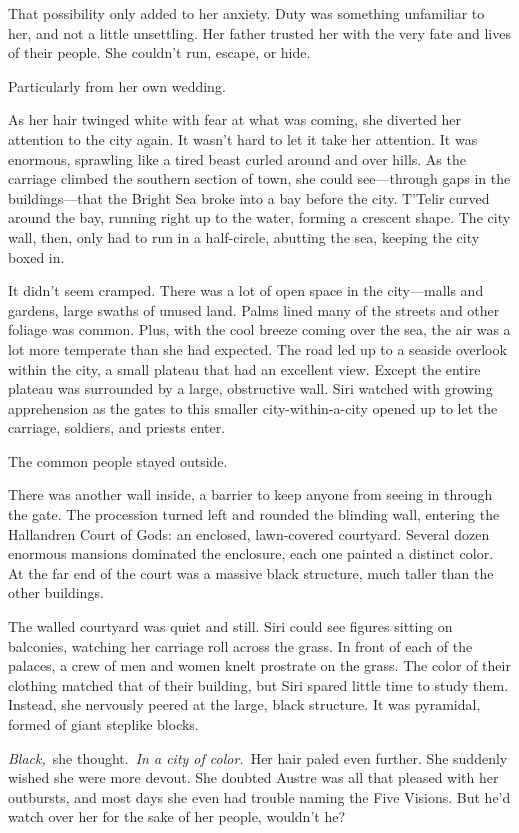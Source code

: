 That possibility only added to her anxiety. Duty was something unfamiliar to her, and not a little unsettling. Her father trusted her with the very fate and lives of their people. She couldn’t run, escape, or hide.

Particularly from her own wedding.

As her hair twinged white with fear at what was coming, she diverted her attention to the city again. It wasn’t hard to let it take her attention. It was enormous, sprawling like a tired beast curled around and over hills. As the carriage climbed the southern section of town, she could see—through gaps in the buildings—that the Bright Sea broke into a bay before the city. T’Telir curved around the bay, running right up to the water, forming a crescent shape. The city wall, then, only had to run in a half-circle, abutting the sea, keeping the city boxed in.

It didn’t seem cramped. There was a lot of open space in the city—malls and gardens, large swaths of unused land. Palms lined many of the streets and other foliage was common. Plus, with the cool breeze coming over the sea, the air was a lot more temperate than she had expected. The road led up to a seaside overlook within the city, a small plateau that had an excellent view. Except the entire plateau was surrounded by a large, obstructive wall. Siri watched with growing apprehension as the gates to this smaller city-within-a-city opened up to let the carriage, soldiers, and priests enter.

The common people stayed outside.

There was another wall inside, a barrier to keep anyone from seeing in through the gate. The procession turned left and rounded the blinding wall, entering the Hallandren Court of Gods: an enclosed, lawn-covered courtyard. Several dozen enormous mansions dominated the enclosure, each one painted a distinct color. At the far end of the court was a massive black structure, much taller than the other buildings.

The walled courtyard was quiet and still. Siri could see figures sitting on balconies, watching her carriage roll across the grass. In front of each of the palaces, a crew of men and women knelt prostrate on the grass. The color of their clothing matched that of their building, but Siri spared little time to study them. Instead, she nervously peered at the large, black structure. It was pyramidal, formed of giant steplike blocks.

\textit{Black,}~she thought.~\textit{In a city of color.}~Her hair paled even further. She suddenly wished she were more devout. She doubted Austre was all that pleased with her outbursts, and most days she even had trouble naming the Five Visions. But he’d watch over her for the sake of her people, wouldn’t he?


